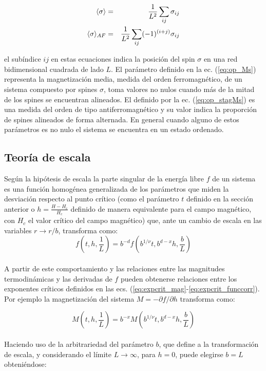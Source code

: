 \begin{center} 
\begin{eqnarray}
	\label{eq:op_Ms}
	\langle \sigma \rangle&=&\frac{1}{L^{2}}\sum_{ij}\sigma_{ij} \\
	\label{eq:op_stagMs}
	\langle \sigma \rangle_{AF}&=&\frac{1}{L^{2}}\sum_{ij}(-1)^{(i+j)}\sigma_{ij} \\
\end{eqnarray}
\end{center}
el subíndice $ij$ en estas ecuaciones indica la posición del spin $\sigma$ en una red bidimensional cuadrada de lado $L$.
El parámetro definido en la ec. (\ref{eq:op_Ms}) representa la magnetización media, medida del orden ferromagnético, de un sistema compuesto por spines $\sigma$,
 toma valores no nulos cuando más de la mitad de los spines se encuentran alineados.
 El definido por la ec. (\ref{eq:op_stagMs}) es una medida del orden de tipo antiferromagnético y su valor indica la proporción de
 spines alineados de forma alternada. En general cuando alguno de estos parámetros es no nulo el sistema se encuentra en un estado ordenado.\\

\subsection{Teoría de escala}
\label{sec:teoria_escala}
Según la hipótesis de escala \cite{fisher_scaling} la parte singular de la
 energía libre $f$ de un sistema es una función homogénea generalizada de los
 parámetros que miden la desviación respecto al punto crítico (como el parámetro $t$
 definido en la sección anterior o $h=\frac{H-H_{c}}{H_{c}}$ definido de manera 
 equivalente para el campo magnético, con $H_{c}$ el valor crítico del campo magnético)
 que, ante un cambio de escala en las variables $r\rightarrow r/b$, transforma como:
\begin{equation}
	\label{eq:sca_hyp}
	f(t,h,\frac{1}{L})=b^{-d}f(b^{1/\nu}t,b^{d-x}h,\frac{b}{L})
\end{equation}
\\

A partir de este comportamiento y las relaciones entre las magnitudes termodinámicas
 y las derivadas de $f$ pueden obtenerse relaciones entre los exponentes críticos
 definidos en las ecs. (\ref{eq:expcrit_mag}-\ref{eq:expcrit_funccorr}).
 Por ejemplo la magnetización del
 sistema $M=-\partial f/\partial h$ transforma como:

\begin{equation}
	\label{eq:sca_mag}
	M(t,h,\frac{1}{L})=b^{-x}M(b^{1/\nu}t,b^{d-x}h,\frac{b}{L})
\end{equation}
\\
Haciendo uso de la arbitrariedad del parámetro $b$, que define a la transformación
de escala, y considerando el límite $L\rightarrow \infty$, para $h=0$, puede elegirse
 $b=L$ obteniéndose:

